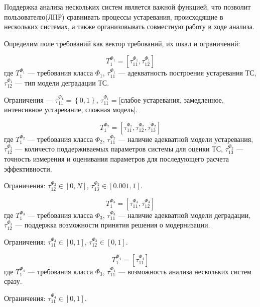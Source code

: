 Поддержка анализа нескольких систем является важной функцией, что позволит пользователю(ЛПР) сравнивать процессы устаревания, происходящие в нескольких системах, а также организовывать совместную работу в ходе анализа.

Определим поле требований как вектор требований, их шкал и ограничений: 

\begin{equation}
    \label{eq:formal_requirements_1}
    T^{\Phi_1}_1=[\tau^{\Phi_1}_{11},\tau^{\Phi_1}_{12}]
\end{equation}
где $T^{\Phi_1}_1$ --- требования класса $\Phi_1$,
$\tau^{\Phi_1}_{11}$ --- адекватность построения устаревания ТС,
$\tau^{\Phi_1}_{12}$ --- тип модели деградации ТС.

Ограничения --- $\tau^{\Phi_1}_{11} = \left\{ 0,1 \right\}$,
$\tau^{\Phi_1}_{11} = $[слабое устаревания, замедленное, интенсивное устаревание, сложная модель].


\begin{equation}
    \label{eq:formal_requirements_2}
    T^{\Phi_2}_1=[\tau^{\Phi_2}_{11},\tau^{\Phi_2}_{12},\tau^{\Phi_2}_{13}]
\end{equation}
где $T^{\Phi_2}_1$ --- требования класса $\Phi_2$,
$\tau^{\Phi_2}_{11}$ --- наличие адекватной модели устаревания,
$\tau^{\Phi_2}_{12}$ --- количесто поддерживаемых параметров системы для оценки ТС,
$\tau^{\Phi_2}_{13}$ --- точность измерения и оценивания параметров для последующего расчета эффективности.

Ограничения: $\tau^{\Phi_2}_{12} \in [0,N]$,
$\tau^{\Phi_2}_{13} \in [0.001,1]$.

\begin{equation}
    \label{eq:formal_requirements_3}
    T^{\Phi_3}_1=[\tau^{\Phi_3}_{11},\tau^{\Phi_3}_{12}]
\end{equation}
где $T^{\Phi_3}_1$ --- требования класса $\Phi_3$,
$\tau^{\Phi_3}_{11}$ --- наличие адекватной модели деградации,
$\tau^{\Phi_3}_{12}$ --- поддержка возможности принятия решения о модернизации.

Ограничения: $\tau^{\Phi_3}_{11} \in [0,1]$,
$\tau^{\Phi_3}_{12} \in [0,1]$.

\begin{equation}
    \label{eq:formal_requirements_4}
    T^{\Phi_4}_1=[\tau^{\Phi_4}_{11}]
\end{equation}
где $T^{\Phi_4}_1$ --- требования класса $\Phi_3$,
$\tau^{\Phi_4}_{11}$ --- возможность анализа нескольких систем сразу.

Ограничения: $\tau^{\Phi_4}_{11} \in [0,1]$.

